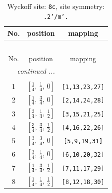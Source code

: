 \documentclass[fleqn,8pt]{jsarticle}
\begin{document}
\renewcommand{\arraystretch}{1.2}
\begin{longtable}{ccc}
\caption{Wyckoff site: {\tt 8c}, site symmetry: {\tt .2'/m'.}}
 \\
 \hline \hline
No. & position & mapping \\ \hline \endfirsthead

\multicolumn{2}{l}{\tablename\ \thetable{}} \\
 \hline \hline
No. & position & mapping \\ \hline \endhead

 \hline \hline
\multicolumn{2}{r}{\footnotesize\it continued ...} \\ \endfoot

 \hline \hline
\multicolumn{2}{r}{} \\ \endlastfoot

1 & $\left[ \frac{1}{4},\, \frac{1}{4},\, 0 \right]$ & {\tt [1,13,23,27]} \\ \hline
2 & $\left[ \frac{1}{4},\, \frac{3}{4},\, 0 \right]$ & {\tt [2,14,24,28]} \\ \hline
3 & $\left[ \frac{3}{4},\, \frac{1}{4},\, \frac{1}{2} \right]$ & {\tt [3,15,21,25]} \\ \hline
4 & $\left[ \frac{3}{4},\, \frac{3}{4},\, \frac{1}{2} \right]$ & {\tt [4,16,22,26]} \\ \hline
5 & $\left[ \frac{3}{4},\, \frac{3}{4},\, 0 \right]$ & {\tt [5,9,19,31]} \\ \hline
6 & $\left[ \frac{3}{4},\, \frac{1}{4},\, 0 \right]$ & {\tt [6,10,20,32]} \\ \hline
7 & $\left[ \frac{1}{4},\, \frac{3}{4},\, \frac{1}{2} \right]$ & {\tt [7,11,17,29]} \\ \hline
8 & $\left[ \frac{1}{4},\, \frac{1}{4},\, \frac{1}{2} \right]$ & {\tt [8,12,18,30]} \\
\end{longtable}
\renewcommand{\arraystretch}{1.2}
\end{document}
